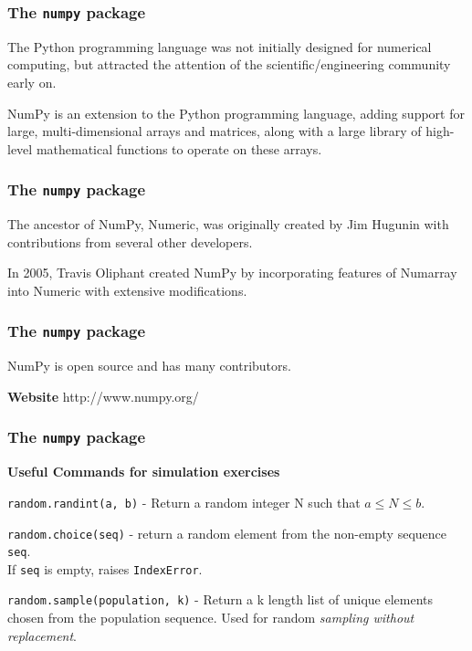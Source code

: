 \documentclass[MASTER.tex]{subfiles}
\begin{document}
 
\frametitle{The \texttt{numpy} package}
 
 
\item The Python programming language was not initially designed for numerical computing, but attracted the attention of the scientific/engineering community early on.

\item NumPy is an extension to the Python programming language, adding support for large, multi-dimensional arrays and matrices, along with a large library of high-level mathematical functions to operate on these arrays. 
 
 
 
\frametitle{The \texttt{numpy} package}
  
 
 
\item The ancestor of NumPy, Numeric, was originally created by Jim Hugunin with contributions from several other developers. 
\item In 2005, Travis Oliphant created NumPy by incorporating features of Numarray into Numeric with extensive modifications. 
 

 
 
\frametitle{The \texttt{numpy} package}
  
 
 
\item NumPy is open source and has many contributors.
\item \textbf{Website} http://www.numpy.org/
 

 

 
\frametitle{The \texttt{numpy} package}
  
\textbf{Useful Commands for simulation exercises}
 
\item \texttt{random.randint(a, b)} - Return a random integer N such that $a \leq N \leq b$.

\item \texttt{random.choice(seq)} - return a random element from the non-empty sequence \texttt{seq}. \\ If \texttt{seq} is empty, raises \texttt{IndexError}.

\item \texttt{random.sample(population, k)} - 
Return a k length list of unique elements chosen from the population sequence. Used for random \textit{sampling without replacement}.
 
 
% 
%
%
%  
% 
%
% 
%  
\end{document}
